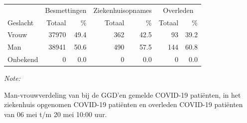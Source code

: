 \documentclass[
  english,
  man,floatsintext]{apa6}
\begin{document}
\begin{table}
\centering\begingroup\fontsize{11}{13}\selectfont

\begin{threeparttable}
\begin{tabular}{lrrrrrr}
\toprule
\multicolumn{1}{c}{ } & \multicolumn{2}{c}{Besmettingen} & \multicolumn{2}{c}{Ziekenhuisopnames} & \multicolumn{2}{c}{Overleden} \\
\cmidrule(l{3pt}r{3pt}){2-3} \cmidrule(l{3pt}r{3pt}){4-5} \cmidrule(l{3pt}r{3pt}){6-7}
Geslacht & Totaal & \% & Totaal & \% & Totaal & \%\\
\midrule
Vrouw & 37970 & 49.4 & 362 & 42.5 & 93 & 39.2\\
Man & 38941 & 50.6 & 490 & 57.5 & 144 & 60.8\\
Onbekend & 0 & 0.0 & 0 & 0.0 & 0 & 0.0\\
\bottomrule
\end{tabular}
\begin{tablenotes}
\item \textit{Note: } 
\item Man-vrouwverdeling van bij de GGD’en gemelde COVID-19 patiënten, in het ziekenhuis opgenomen COVID-19 patiënten en overleden COVID-19 patiënten van 06 mei t/m 20 mei 10:00 uur.
\end{tablenotes}
\end{threeparttable}
\endgroup{}
\end{table}
\newpage
\end{document}
